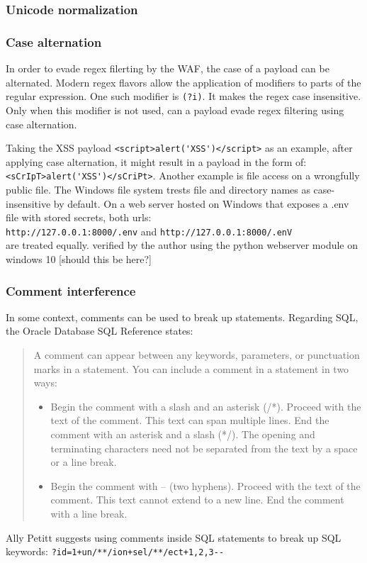 \subsubsection{Unicode normalization}
\cite{unicode/normalization}
\cite{medium/allypetitt}


\subsubsection{Case alternation}
In order to evade regex filerting by the WAF, the case of a payload can be alternated. \cite{medium/allypetitt}
Modern regex flavors allow the application of modifiers to parts of the regular expression.
One such modifier is \verb|(?i)|. It makes the regex case insensitive. \cite{regex/jan} Only when this modifier is not used, can a payload evade regex filtering using case alternation.

Taking the XSS payload \verb|<script>alert('XSS')</script>| as an example, after applying case alternation, it might result in a payload in the form of: \verb|<sCrIpT>alert('XSS')</sCriPt>|.
Another example is file access on a wrongfully public file.
The Windows file system trests file and directory names as case-insensitive by default. \cite{windows/casesensitive}
On a web server hosted on Windows that exposes a .env file with stored secrets, both urls: \\ \verb|http://127.0.0.1:8000/.env| and \verb|http://127.0.0.1:8000/.enV| \\
are treated equally. {\color{blue} verified by the author using the python webserver module on windows 10 [should this be here?]}


\subsubsection{Comment interference}
In some context, comments can be used to break up statements. Regarding SQL, the Oracle Database SQL Reference states:
\begin{quote}
	A comment can appear between any keywords, parameters, or punctuation marks in a statement. You can include a comment in a statement in two ways:
	\begin{itemize}
		\item Begin the comment with a slash and an asterisk (/*). Proceed with the text of the comment. This text can span multiple lines. End the comment with an asterisk and a slash (*/). The opening and terminating characters need not be separated from the text by a space or a line break.
		\item Begin the comment with -- (two hyphens). Proceed with the text of the comment. This text cannot extend to a new line. End the comment with a line break.
	\end{itemize}
	\cite{oracle/sqlcomments}
\end{quote}
Ally Petitt suggests using comments inside SQL statements to break up SQL keywords: \verb|?id=1+un/**/ion+sel/**/ect+1,2,3--| \cite{medium/allypetitt}


